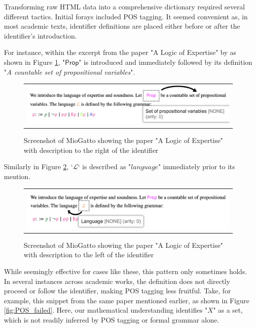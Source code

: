 Transforming raw HTML data into a comprehensive dictionary required several different tactics. Initial forays included \ac{POS} tagging. It seemed convenient as, in most academic texts, identifier definitions are placed either before or after the identifier's introduction.

For instance, within the excerpt from the paper "A Logic of Expertise" by  \citet{singleton2021logic} as shown in Figure \ref{fig:POS_right}, "$\mathsf{Prop}$" is introduced and immediately followed by its definition "\textit{A countable set of propositional variables}".

\begin{figure}[htpb]
  \centering
  \begin{tabular}{c}
  \includegraphics[width=14cm]{images/POS_right.png}
  \end{tabular}
  \caption[POS Tagging Right]{Screenshot of MioGatto showing the paper "A Logic of Expertise" with description to the right of the identifier}\label{fig:POS_right}
\end{figure}

Similarly in Figure \ref{fig:POS_left}, `$\mathcal{L}$` is described as "$language$" immediately prior to its mention.

\begin{figure}[htpb]
  \centering
  \begin{tabular}{c}
  \includegraphics[width=14cm]{images/POS_left.png}
  \end{tabular}
  \caption[POS Tagging Left]{Screenshot of MioGatto showing the paper "A Logic of Expertise" with description to the left of the identifier}\label{fig:POS_left}
\end{figure}

While seemingly effective for cases like these, this pattern only sometimes holds. In several instances across academic works, the definition does not directly proceed or follow the identifier, making POS tagging less fruitful. Take, for example, this snippet from the same paper mentioned earlier, as shown in Figure \ref{fig:POS_failed}. Here, our mathematical understanding identifies "$X$" as a set, which is not readily inferred by POS tagging or formal grammar alone.

